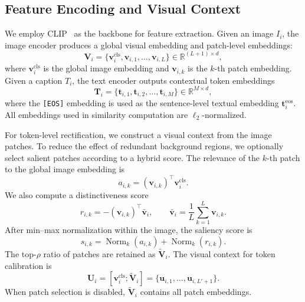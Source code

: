 \subsection{Feature Encoding and Visual Context}
We employ CLIP~\cite{clip} as the backbone for feature extraction. Given an image $I_i$, the image encoder produces a global visual embedding and patch-level embeddings:
\begin{equation}
    \mathbf{V}_i=
    \{\boldsymbol{v}_{i}^{\mathrm{cls}},\boldsymbol{v}_{i,1},\ldots,\boldsymbol{v}_{i,L}\}
    \in\mathbb{R}^{(L+1)\times d},
\end{equation}
where $\boldsymbol{v}_{i}^{\mathrm{cls}}$ is the global image embedding and $\boldsymbol{v}_{i,k}$ is the $k$-th patch embedding. Given a caption $T_i$, the text encoder outputs contextual token embeddings
\begin{equation}
    \mathbf{T}_i=
    \{\boldsymbol{t}_{i,1},\boldsymbol{t}_{i,2},\ldots,\boldsymbol{t}_{i,M}\}
    \in\mathbb{R}^{M\times d},
\end{equation}
where the \texttt{[EOS]} embedding is used as the sentence-level textual embedding $\boldsymbol{t}_{i}^{\mathrm{eos}}$. All embeddings used in similarity computation are $\ell_2$-normalized.

For token-level rectification, we construct a visual context from the image patches. To reduce the effect of redundant background regions, we optionally select salient patches according to a hybrid score. The relevance of the $k$-th patch to the global image embedding is
\begin{equation}
    a_{i,k}=(\boldsymbol{v}_{i,k})^{\top}\boldsymbol{v}_{i}^{\mathrm{cls}}.
\end{equation}
We also compute a distinctiveness score
\begin{equation}
    r_{i,k}=-(\boldsymbol{v}_{i,k})^{\top}\bar{\boldsymbol{v}}_{i},
    \qquad
    \bar{\boldsymbol{v}}_{i}=\frac{1}{L}\sum_{k=1}^{L}\boldsymbol{v}_{i,k}.
\end{equation}
After min--max normalization within the image, the saliency score is
\begin{equation}
    s_{i,k}=\operatorname{Norm}_{k}(a_{i,k})+\operatorname{Norm}_{k}(r_{i,k}).
\end{equation}
The top-$\rho$ ratio of patches are retained as $\widetilde{\mathbf{V}}_i$. The visual context for token calibration is
\begin{equation}
    \mathbf{U}_i=[\boldsymbol{v}_{i}^{\mathrm{cls}};\widetilde{\mathbf{V}}_i]
    =\{\boldsymbol{u}_{i,1},\ldots,\boldsymbol{u}_{i,L'+1}\}.
\end{equation}
When patch selection is disabled, $\widetilde{\mathbf{V}}_i$ contains all patch embeddings.

